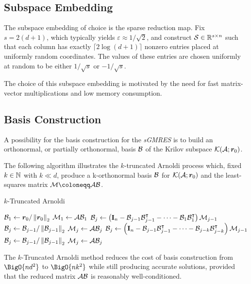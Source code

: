 \subsection{Subspace Embedding}

The subspace embedding of choice is the sparse reduction map. Fix $s = 2 \left( d + 1 \right)$, which typically yields $\varepsilon \approx 1 / \sqrt{2}$, and construct $\mathcal{S} \in \mathbb{R}^{s \times n}$ such that each column has exactly $\lceil 2 \log \left( d + 1 \right) \rceil$ nonzero entries placed at uniformly random coordinates. The values of these entries are chosen uniformly at random to be either $1 / \sqrt{s}$ or $-1 / \sqrt{s}$.

The choice of this subspace embedding is motivated by the need for fast matrix-vector multiplications and low memory consumption.

\subsection{Basis Construction} \label{sseq:basis}

A possibility for the basis construction for the \textit{sGMRES} is to build an orthonormal, or partially orthonormal, basis $\mathcal{B}$ of the Krilov subspace $\mathcal{K}(\mathcal{A}; \bm{r}_0)$.

The following algorithm illustrates the $k$-truncated Arnoldi process which, fixed $k \in \mathbb{N}$ with $k \ll d$, produce a k-orthonormal basis $\mathcal{B}$ for $\mathcal{K}(\mathcal{A}; \bm{r}_0)$ and the least-squares matrix $\Matrix{M} \coloneqq \Matrix{A} \Matrix{B}$.

\begin{algorithm}
\caption{$k$-Truncated Arnoldi} \label{alg:arnoldi}
\begin{algorithmic}
\State $\mathcal{B}_1 \gets \bm{r}_0 / \left\lVert \bm{r}_0 \right\rVert_2$
\State $\mathcal{M}_1 \gets \mathcal{A} \mathcal{B}_1$
\State $\mathcal{B}_j \gets \left( \mathbf{I}_n - \mathcal{B}_{j - 1}\mathcal{B}_{j - 1}^{\intercal} - \dots - \mathcal{B}_{1}\mathcal{B}_{1}^{\intercal} \right) \mathcal{M}_{j - 1}$
\State $\mathcal{B}_j \gets \mathcal{B}_{j - 1} / \left\lVert \mathcal{B}_{j - 1} \right\rVert_2$
\State $\mathcal{M}_j \gets \mathcal{A} \mathcal{B}_j$
\EndFor
{}
\State $\mathcal{B}_j \gets \left( \mathbf{I}_n - \mathcal{B}_{j - 1}\mathcal{B}_{j - 1}^{\intercal} - \dots - \mathcal{B}_{j - k}\mathcal{B}_{j - k}^{\intercal} \right) \mathcal{M}_{j - 1}$
\State $\mathcal{B}_j \gets \mathcal{B}_{j - 1} / \left\lVert \mathcal{B}_{j - 1} \right\rVert_2$
\State $\mathcal{M}_j \gets \mathcal{A} \mathcal{B}_j$
\EndFor
\end{algorithmic}
\end{algorithm}

The $k$-Truncated Arnoldi method reduces the cost of basis construction from $\BigO{n d^2}$ to $\BigO{n k^2}$ while still producing accurate solutions, provided that the reduced matrix $\mathcal{A} \mathcal{B}$ is reasonably well-conditioned.